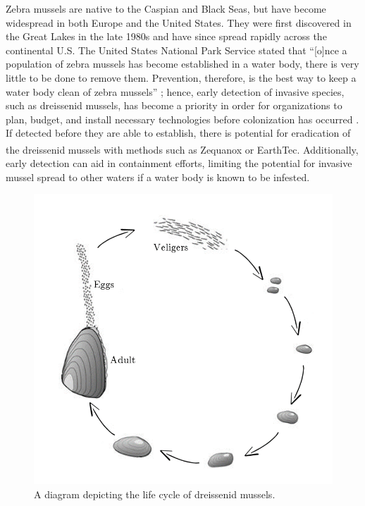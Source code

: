 \documentclass[12pt]{article}\usepackage[]{graphicx}\usepackage[]{color}
\begin{document}
Zebra mussels are native to the Caspian and Black Seas, but have become widespread in both Europe and the United States. They were first discovered in the Great Lakes in the late 1980s and have since spread rapidly across the continental U.S. The United States National Park Service stated that ``[o]nce a population of zebra mussels has become established in a water body, there is very little to be done to remove them. Prevention, therefore, is the best way to keep a water body clean of zebra mussels'' \cite{NPS}; hence, early detection of invasive species, such as dreissenid mussels, has become a priority in order for organizations to plan, budget, and install necessary technologies before colonization has occurred \cite{Holser:body}. If detected before they are able to establish, there is potential for eradication of the dreissenid mussels with methods such as Zequanox\textsuperscript{\tiny\textregistered} or EarthTec\textsuperscript{\tiny\textregistered}. Additionally,  early detection can aid in containment efforts, limiting the potential for invasive mussel spread to other waters if a water body is known to be infested. 

\begin{figure}[]
	\centering
	\includegraphics[scale = 0.6]{images/lifecycle}
	\caption{A diagram depicting the life cycle of dreissenid mussels.}
	\label{fig:lifecycle}
\end{figure}
\end{document}

